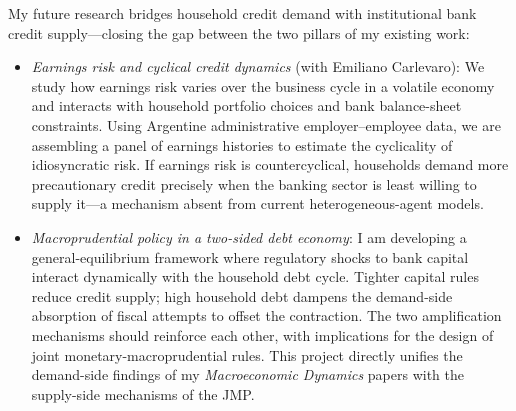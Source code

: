 \documentclass[12pt,a4paper]{article}
\begin{document}
My future research bridges household credit demand with institutional bank credit supply---closing the gap between the two pillars of my existing work:

\begin{itemize}[nosep, leftmargin=1.5em]\itemsep0.3em
\item \textit{Earnings risk and cyclical credit dynamics} (with Emiliano Carlevaro): We study how earnings risk varies over the business cycle in a volatile economy and interacts with household portfolio choices and bank balance-sheet constraints. Using Argentine administrative employer--employee data, we are assembling a panel of earnings histories to estimate the cyclicality of idiosyncratic risk. If earnings risk is countercyclical, households demand more precautionary credit precisely when the banking sector is least willing to supply it---a mechanism absent from current heterogeneous-agent models.

\item \textit{Macroprudential policy in a two-sided debt economy}: I am developing a general-equilibrium framework where regulatory shocks to bank capital interact dynamically with the household debt cycle. Tighter capital rules reduce credit supply; high household debt dampens the demand-side absorption of fiscal attempts to offset the contraction. The two amplification mechanisms should reinforce each other, with implications for the design of joint monetary-macroprudential rules. This project directly unifies the demand-side findings of my \textit{Macroeconomic Dynamics} papers with the supply-side mechanisms of the JMP.
\end{itemize}
\end{document}
